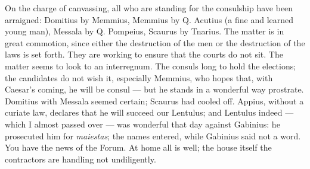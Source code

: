  On the charge of canvassing, all who are standing for the consulship have been arraigned: Domitius by Memmius, Memmius by Q. Acutius (a fine and learned young man), Messala by Q. Pompeius, Scaurus by Tnarius. The matter is in great commotion, since either the destruction of the men or the destruction of the laws is set forth. They are working to ensure that the courts do not sit. The matter seems to look to an interregnum. The consuls long to hold the elections; the candidates do not wish it, especially Memmius, who hopes that, with Caesar's coming, he will be consul --- but he stands in a wonderful way prostrate. Domitius with Messala seemed certain; Scaurus had cooled off. Appius, without a curiate law, declares that he will succeed our Lentulus; and Lentulus indeed --- which I almost passed over --- was wonderful that day against Gabinius: he prosecuted him for \textit{maiestas}; the names entered, while Gabinius said not a word. You have the news of the Forum. At home all is well; the house itself the contractors are handling not undiligently.
